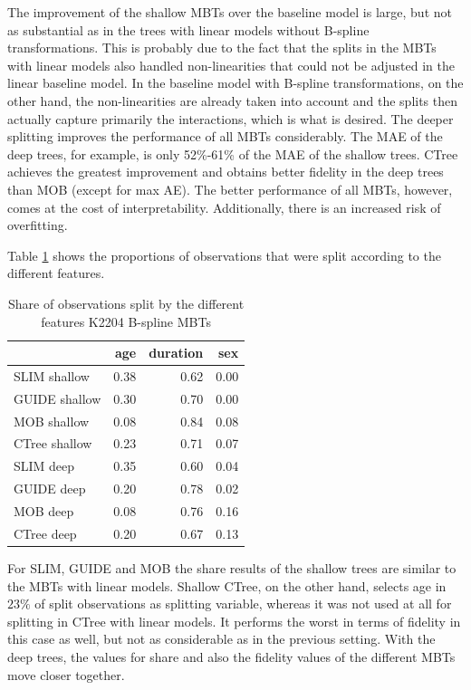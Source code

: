 The improvement of the shallow MBTs over the baseline model is large, but not as substantial as in the trees with linear models without B-spline transformations. This is probably due to the fact that the splits in the MBTs with linear models also handled non-linearities that could not be adjusted in the linear baseline model. In the baseline model with B-spline transformations, on the other hand, the non-linearities are already taken into account and the splits then actually capture primarily the interactions, which is what is desired. 
The deeper splitting improves the performance of all MBTs considerably. The MAE of the deep trees, for example, is only 52\%-61\% of the MAE of the shallow trees. CTree achieves the greatest improvement and obtains better fidelity in the deep trees than MOB (except for max AE). The better performance of all MBTs, however, comes at the cost of interpretability. Additionally, there is an increased risk of overfitting.


Table \ref{tab:ins_k2204_bsplines_surrogates_share}  shows the proportions of observations that were split according to the different features. 


\begin{table}[!htb]
\caption{Share of observations split by the different features K2204 B-spline MBTs}
\centering \scriptsize
\begin{tabular}[t]{l|r|r|r}
\hline
  & age & duration & sex\\
\hline
SLIM shallow & 0.38 & 0.62 & 0.00\\
GUIDE shallow & 0.30 & 0.70 & 0.00\\
MOB shallow & 0.08 & 0.84 & 0.08\\
CTree shallow & 0.23 & 0.71 & 0.07\\
\hline
SLIM deep & 0.35 & 0.60 & 0.04\\
GUIDE deep & 0.20 & 0.78 & 0.02\\
MOB deep & 0.08 & 0.76 & 0.16\\
CTree deep & 0.20 & 0.67 & 0.13\\
\hline
\end{tabular}
\label{tab:ins_k2204_bsplines_surrogates_share}
\end{table}

For SLIM, GUIDE and MOB the share results of the shallow trees are similar to the MBTs with linear models. Shallow CTree, on the other hand, selects age in $23\%$ of split observations as splitting variable, whereas it was not used at all for splitting in CTree with linear models. It performs the worst in terms of fidelity in this case as well, but not as considerable as in the previous setting.
With the deep trees, the values for share and also the fidelity values of the different MBTs move closer together.



